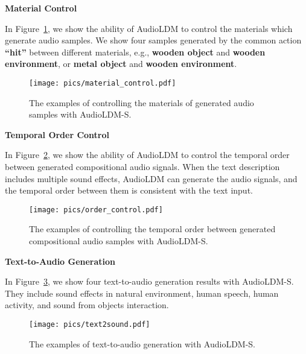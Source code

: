 \newpage

\textbf{Material Control}

In Figure~\ref{fig:material}, we show the ability of AudioLDM to control the materials which generate audio samples. We show four samples generated by the common action \textbf{``hit''} between different materials, e.g., \textbf{wooden object} and \textbf{wooden environment}, or \textbf{metal object} and \textbf{wooden environment}. 

\vspace{0.5cm}

\begin{figure}[H]
    \centering
    \texttt{[image: pics/material\_control.pdf]}
    \caption{The examples of controlling the materials of generated audio samples with AudioLDM-S.}
    \label{fig:material}
\vspace{0.5cm}
\end{figure}

\vspace{0.5cm}
\textbf{Temporal Order Control}

In Figure~\ref{fig:temporalorder}, we show the ability of AudioLDM to control the temporal order between generated compositional audio signals. When the text description includes multiple sound effects, AudioLDM can generate the audio signals, and the temporal order between them is consistent with the text input.

\begin{figure}[H]
    \centering
    \texttt{[image: pics/order\_control.pdf]}
    \caption{The examples of controlling the temporal order between generated compositional audio samples with AudioLDM-S.}
    \label{fig:temporalorder}
\vspace{0.5cm}
\end{figure}

\textbf{Text-to-Audio Generation}

In Figure~\ref{fig:text-to-audio}, we show four text-to-audio generation results with AudioLDM-S. They include sound effects in natural environment, human speech, human activity, and sound from objects interaction.

\vspace{0.3cm}

\begin{figure}[H]
    \centering
    \texttt{[image: pics/text2sound.pdf]}
    \caption{The examples of text-to-audio generation with AudioLDM-S.}
    \label{fig:text-to-audio}
\vspace{0.6cm}
\end{figure}

